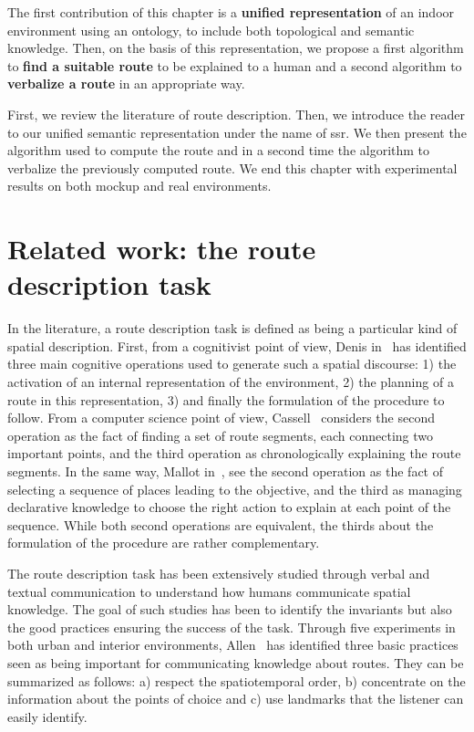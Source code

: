 The first contribution of this chapter is a \textbf{unified representation} of an indoor environment using an ontology, to include both topological and semantic knowledge. Then, on the basis of this representation, we propose a first algorithm to \textbf{find a suitable route} to be explained to a human and a second algorithm to \textbf{verbalize a route} in an appropriate way.

First, we review the literature of route description. Then, we introduce the reader to our unified semantic representation under the name of \acrfull{ssr}. We then present the algorithm used to compute the route and in a second time the algorithm to verbalize the previously computed route. We end this chapter with experimental results on both mockup and real environments.

\section[Related work]{Related work: the route description task}


In the literature, a route description task is defined as being a particular kind of spatial description. First, from a cognitivist point of view, Denis in~\cite{denis_1997_description} has identified three main cognitive operations used to generate such a spatial discourse: 1) the activation of an internal representation of the environment, 2) the planning of a route in this representation, 3) and finally the formulation of the procedure to follow. From a computer science point of view, Cassell~\cite{cassell_2007_trading} considers the second operation as the fact of finding a set of route segments, each connecting two important points, and the third operation as chronologically explaining the route segments. In the same way, Mallot in~\cite{mallot_2009_embodied}, see the second operation as the fact of selecting a sequence of places leading to the objective, and the third as managing declarative knowledge to choose the right action to explain at each point of the sequence. While both second operations are equivalent, the thirds about the formulation of the procedure are rather complementary.

The route description task has been extensively studied through verbal and textual communication to understand how humans communicate spatial knowledge. The goal of such studies has been to identify the invariants but also the good practices ensuring the success of the task. Through five experiments in both urban and interior environments, Allen~\cite{allen_2000_principles} has identified three basic practices seen as being important for communicating knowledge about routes. They can be summarized as follows: a) respect the spatiotemporal order, b) concentrate on the information about the points of choice and c) use landmarks that the listener can easily identify.

